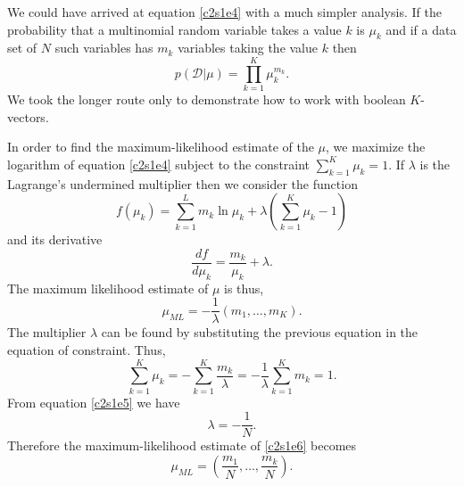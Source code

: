 We could have arrived at equation \eqref{c2s1e4} with a much simpler analysis. If the probability
that a multinomial random variable takes a value $k$ is $\mu_k$ and if a data set of $N$ such
variables has $m_k$ variables taking the value $k$ then
\[
p(\mathcal{D}|\mu) = \prod_{k=1}^K \mu_k^{m_k}.
\]
We took the longer route only to demonstrate how to work with boolean $K$-vectors.

In order to find the maximum-likelihood estimate of the $\mu$, we maximize the logarithm of
equation \eqref{c2s1e4} subject to the constraint $\sum_{k=1}^K \mu_k = 1$. If $\lambda$ is
the Lagrange's undermined multiplier then we consider the function
\[
f(\mu_k) = \sum_{k=1}^Lm_k\ln{\mu_k} + \lambda\left(\sum_{k=1}^K \mu_k - 1\right)
\]
and its derivative
\[
\frac{df}{d\mu_k} = \frac{m_k}{\mu_k} + \lambda.
\]
The maximum likelihood estimate of $\mu$ is thus,
\begin{equation}\label{c2s1e6}
\mu_{ML} = -\frac{1}{\lambda}(m_1, \ldots, m_K).
\end{equation}
The multiplier $\lambda$ can be found by substituting the previous equation in the equation
of constraint. Thus,
\[
\sum_{k=1}^K \mu_k = -\sum_{k=1}^K \frac{m_k}{\lambda} = -\frac{1}{\lambda}\sum_{k=1}^K m_k = 1.
\]
From equation \eqref{c2s1e5} we have
\[
\lambda = -\frac{1}{N}.
\]
Therefore the maximum-likelihood estimate of \eqref{c2s1e6} becomes
\begin{equation}\label{c2s1e7}
\mu_{ML} = \left(\frac{m_1}{N}, \ldots, \frac{m_k}{N}\right).
\end{equation}

